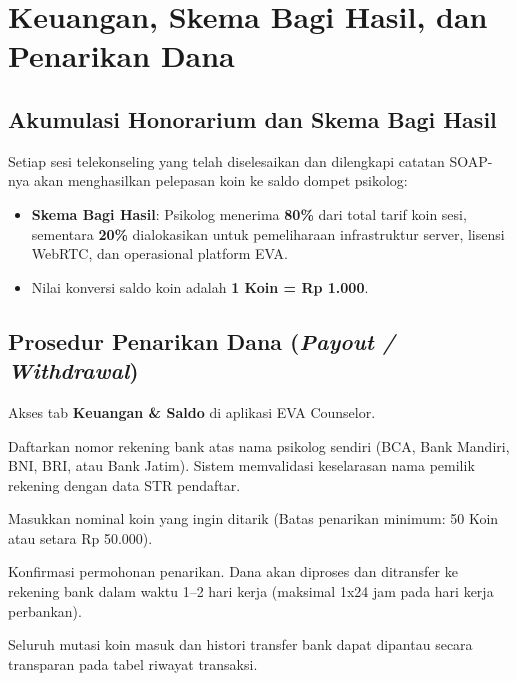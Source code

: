 
\section{Keuangan, Skema Bagi Hasil, dan Penarikan Dana}

\subsection{Akumulasi Honorarium dan Skema Bagi Hasil}
Setiap sesi telekonseling yang telah diselesaikan dan dilengkapi catatan SOAP-nya akan menghasilkan pelepasan koin ke saldo dompet psikolog:
\begin{itemize}[leftmargin=1.4em]
  \item \textbf{Skema Bagi Hasil}: Psikolog menerima \textbf{80\%} dari total tarif koin sesi, sementara \textbf{20\%} dialokasikan untuk pemeliharaan infrastruktur server, lisensi WebRTC, dan operasional platform EVA.
  \item Nilai konversi saldo koin adalah \textbf{1 Koin = Rp 1.000}.
\end{itemize}

\subsection{Prosedur Penarikan Dana (\textit{Payout / Withdrawal})}
\begin{steplist}
  \item Akses tab \textbf{Keuangan \& Saldo} di aplikasi EVA Counselor.
  \item Daftarkan nomor rekening bank atas nama psikolog sendiri (BCA, Bank Mandiri, BNI, BRI, atau Bank Jatim). Sistem memvalidasi keselarasan nama pemilik rekening dengan data STR pendaftar.
  \item Masukkan nominal koin yang ingin ditarik (Batas penarikan minimum: 50 Koin atau setara Rp 50.000).
  \item Konfirmasi permohonan penarikan. Dana akan diproses dan ditransfer ke rekening bank dalam waktu 1--2 hari kerja (maksimal 1x24 jam pada hari kerja perbankan).
  \item Seluruh mutasi koin masuk dan histori transfer bank dapat dipantau secara transparan pada tabel riwayat transaksi.
\end{steplist}

